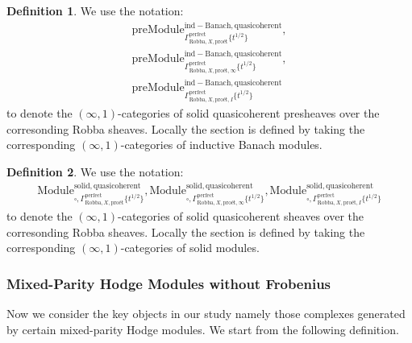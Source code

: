 \documentclass[12pt]{book}
\theoremstyle{definition}
\newtheorem{definition}{Definition}
\begin{document}
\begin{definition}
We use the notation:
\begin{align}
\mathrm{preModule}^\mathrm{ind-Banach,quasicoherent}_{\Gamma^\mathrm{perfect}_{\text{Robba},X,\text{pro\'et}}\{t^{1/2}\}},\\
\mathrm{preModule}^\mathrm{ind-Banach,quasicoherent}_{\Gamma^\mathrm{perfect}_{\text{Robba},X,\text{pro\'et},\infty}\{t^{1/2}\}},\\
\mathrm{preModule}^\mathrm{ind-Banach,quasicoherent}_{\Gamma^\mathrm{perfect}_{\text{Robba},X,\text{pro\'et},I}\{t^{1/2}\}} 
\end{align}
to denote the $(\infty,1)$-categories of solid quasicoherent presheaves over the corresonding Robba sheaves. Locally the section is defined by taking the corresponding $(\infty,1)$-categories of inductive Banach  modules. 
\end{definition}

\begin{definition}
We use the notation:
\begin{align}
\mathrm{Module}^\mathrm{solid,quasicoherent}_{\square,\Gamma^\mathrm{perfect}_{\text{Robba},X,\text{pro\'et}}\{t^{1/2}\}},\mathrm{Module}^\mathrm{solid,quasicoherent}_{\square,\Gamma^\mathrm{perfect}_{\text{Robba},X,\text{pro\'et},\infty}\{t^{1/2}\}},
\mathrm{Module}^\mathrm{solid,quasicoherent}_{\square,\Gamma^\mathrm{perfect}_{\text{Robba},X,\text{pro\'et},I}\{t^{1/2}\}} 
\end{align}
to denote the $(\infty,1)$-categories of solid quasicoherent sheaves over the corresonding Robba sheaves. Locally the section is defined by taking the corresponding $(\infty,1)$-categories of solid modules.
\end{definition}


\subsubsection{Mixed-Parity Hodge Modules without Frobenius}

\noindent Now we consider the key objects in our study namely those complexes generated by certain mixed-parity Hodge modules. We start from the following definition.
\end{document}
